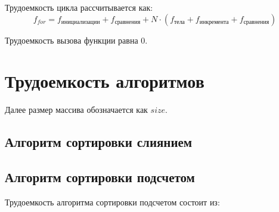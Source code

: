 Трудоемкость цикла рассчитывается как:
\begin{equation}
	\label{for:for}
	f_{for} = f_{\text{инициализации}} + f_{\text{сравнения}} + N \cdot (f_{\text{тела}} + f_{\text{инкремента}} + f_{\text{сравнения}})
\end{equation}

Трудоемкость вызова функции равна 0.

\section{Трудоемкость алгоритмов}

Далее размер массива обозначается как $size$.

\subsection{Алгоритм сортировки слиянием}

\subsection{Алгоритм сортировки подсчетом}

Трудоемкость алгоритма сортировки подсчетом состоит из:

